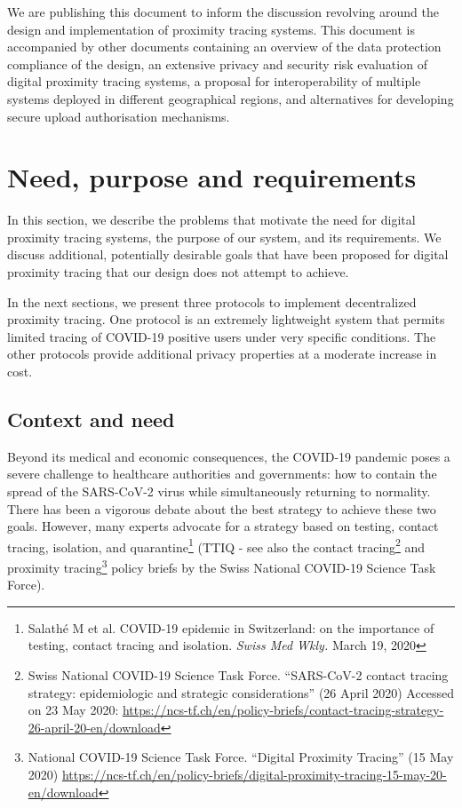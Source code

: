 \documentclass{article}
\begin{document}
We are publishing this document to inform the discussion revolving
around the design and implementation of proximity tracing systems. This
document is accompanied by other documents containing an overview of the
data protection compliance of the design, an extensive privacy and
security risk evaluation of digital proximity tracing systems, a
proposal for interoperability of multiple systems deployed in different
geographical regions, and alternatives for developing secure upload
authorisation mechanisms.


\newpage
\section{Need, purpose and requirements}\label{need-purpose-and-requirements}

In this section, we describe the problems that motivate the need for
digital proximity tracing systems, the purpose of our system, and its
requirements. We discuss additional, potentially desirable goals that
have been proposed for digital proximity tracing that our design does
not attempt to achieve.

In the next sections, we present three protocols to implement
decentralized proximity tracing. One protocol is an extremely
lightweight system that permits limited tracing of COVID-19 positive
users under very specific conditions. The other protocols provide
additional privacy properties at a moderate increase in cost.

\subsection{Context and need}\label{context-and-need}

Beyond its medical and economic consequences, the COVID-19 pandemic
poses a severe challenge to healthcare authorities and governments: how
to contain the spread of the SARS-CoV-2 virus while simultaneously
returning to normality. There has been a vigorous debate about the best
strategy to achieve these two goals. However, many experts advocate for
a strategy based on testing, contact tracing, isolation, and
quarantine\footnote{Salathé M et al. COVID-19 epidemic in Switzerland:
  on the importance of testing, contact tracing and isolation.
  \emph{Swiss Med Wkly.} March 19, 2020} (TTIQ - see also the contact
tracing\footnote{Swiss National COVID-19 Science Task Force.
  ``SARS-CoV-2 contact tracing strategy: epidemiologic and strategic
  considerations'' (26 April 2020) Accessed on 23 May 2020:
  \url{https://ncs-tf.ch/en/policy-briefs/contact-tracing-strategy-26-april-20-en/download}}
and proximity tracing\footnote{National COVID-19 Science Task Force.
  ``Digital Proximity Tracing'' (15 May 2020)
  \url{https://ncs-tf.ch/en/policy-briefs/digital-proximity-tracing-15-may-20-en/download}}
policy briefs by the Swiss National COVID-19 Science Task Force).
\end{document}
